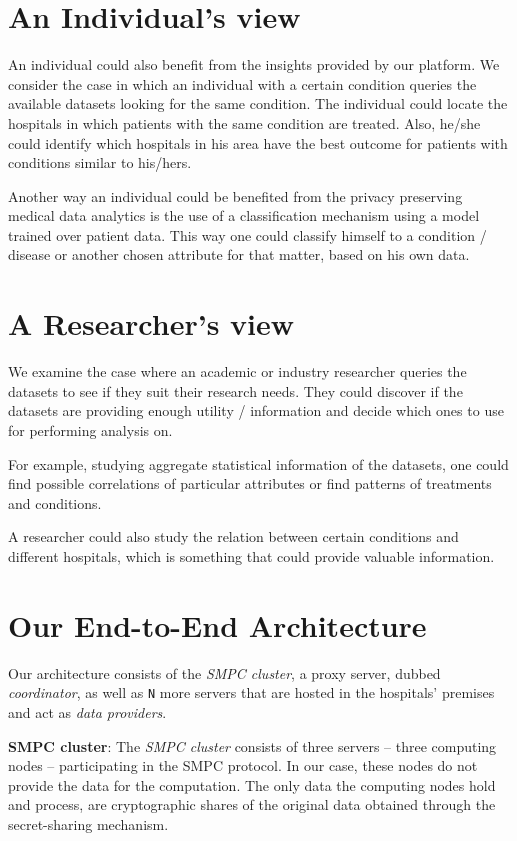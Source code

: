 \section{An Individual's view}
An individual could also benefit from the insights provided by our platform.
We consider the case in which an individual with a certain condition queries the available datasets looking for the same condition.
The individual could locate the hospitals in which patients with the same condition are treated.
Also, he/she could identify which hospitals in his area have the best outcome for patients with conditions similar to his/hers.


Another way an individual could be benefited from the privacy preserving medical data analytics is the use of a classification mechanism using a model trained over patient data.
This way one could classify himself to a condition / disease or another chosen attribute for that matter, based on his own data.


\section{A Researcher's view}
We examine the case where an academic or industry researcher queries the datasets to see if they suit their research needs.
They could discover if the datasets are providing enough utility / information and decide which ones to use for performing analysis on.

For example, studying aggregate statistical information of the datasets, one could find possible correlations of particular attributes or find patterns of treatments and conditions.

A researcher could also study the relation between certain conditions and different hospitals, which is something that could provide valuable information.



\section{Our End-to-End Architecture}\label{s:architecture}
Our architecture consists of the \textit{SMPC cluster}, a proxy server, dubbed \textit{coordinator}, as well as \texttt{N} more servers that are hosted in the hospitals' premises and act as \textit{data providers}.

\textbf{SMPC cluster}: The \textit{SMPC cluster} consists of three servers -- three computing nodes -- participating in the SMPC protocol.
In our case, these nodes do not provide the data for the computation.
The only data the computing nodes hold and process, are cryptographic shares of the original data obtained through the secret-sharing mechanism.

